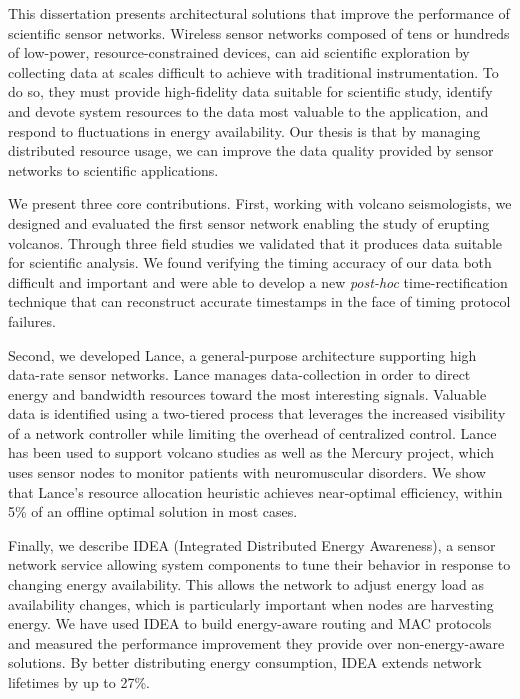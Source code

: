 \hspace{0.25in}

This dissertation presents architectural solutions that improve the
performance of scientific sensor networks. Wireless sensor networks composed
of tens or hundreds of low-power, resource-constrained devices, can aid
scientific exploration by collecting data at scales difficult to achieve with
traditional instrumentation. To do so, they must provide high-fidelity data
suitable for scientific study, identify and devote system resources to the
data most valuable to the application, and respond to fluctuations in energy
availability. Our thesis is that by managing distributed resource usage, we
can improve the data quality provided by sensor networks to scientific
applications.

We present three core contributions. First, working with volcano
seismologists, we designed and evaluated the first sensor network enabling
the study of erupting volcanos. Through three field studies we validated that
it produces data suitable for scientific analysis. We found verifying the
timing accuracy of our data both difficult and important and were able to
develop a new \textit{post-hoc} time-rectification technique that can
reconstruct accurate timestamps in the face of timing protocol failures.

Second, we developed Lance, a general-purpose architecture supporting high
data-rate sensor networks. Lance manages data-collection in order to direct
energy and bandwidth resources toward the most interesting signals. Valuable
data is identified using a two-tiered process that leverages the increased
visibility of a network controller while limiting the overhead of centralized
control. Lance has been used to support volcano studies as well as the
Mercury project, which uses sensor nodes to monitor patients with
neuromuscular disorders. We show that Lance's resource allocation heuristic
achieves near-optimal efficiency, within 5\% of an offline optimal solution
in most cases.

Finally, we describe IDEA (Integrated Distributed Energy Awareness), a sensor
network service allowing system components to tune their behavior in response
to changing energy availability. This allows the network to adjust energy
load as availability changes, which is particularly important when nodes are
harvesting energy. We have used IDEA to build energy-aware routing and MAC
protocols and measured the performance improvement they provide over
non-energy-aware solutions. By better distributing energy consumption, IDEA
extends network lifetimes by up to 27\%.
